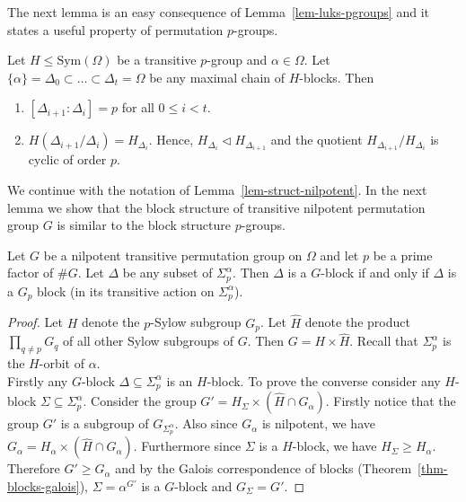 \documentclass{llncs}
\newcommand{\Sym}[1]{{\ensuremath{\mathrm{Sym}\left(#1\right)}}}
\begin{document}
The next lemma is an easy consequence of Lemma~\ref{lem-luks-pgroups}
and it states a useful property of permutation $p$-groups.

\begin{lemma}\label{lem-struct-pgroups}
  Let $H\leq\Sym{\Omega}$ be a transitive $p$-group and
  $\alpha\in\Omega$. Let $\{ \alpha \} = \Delta_0 \subset \ldots
  \subset \Delta_t = \Omega$ be any maximal chain of $H$-blocks. Then
  \begin{enumerate}
  \item $[\Delta_{i+1}: \Delta_i] = p$ for all $0 \leq i < t$.
  \item $H(\Delta_{i+1}/\Delta_i) = H_{\Delta_i}$. Hence,
    $H_{\Delta_i}\lhd H_{\Delta_{i+1}}$ and the quotient
    $H_{\Delta_{i+1}}/H_{\Delta_i}$ is cyclic of order $p$.
  \end{enumerate}
\end{lemma}


We continue with the notation of Lemma~\ref{lem-struct-nilpotent}. In
the next lemma we show that the block structure of transitive
nilpotent permutation group $G$ is similar to the block structure $p$-groups.

\begin{lemma}\label{lem-nilpotent-pgroup}
  Let $G$ be a nilpotent transitive permutation group on $\Omega$ and
let $p$ be a prime factor of $\# G$. Let $\Delta$ be any subset of
$\Sigma_p^\alpha$. Then $\Delta$ is a $G$-block if and only if
$\Delta$ is a $G_p$ block (in its transitive action on
$\Sigma^\alpha_p$).
\end{lemma}
\begin{proof}
  Let $H$ denote the $p$-Sylow subgroup $G_p$. Let $\widehat{H}$
 denote the product $\prod_{q\neq p}G_q$ of all other Sylow subgroups
 of $G$. Then $G=H\times\widehat{H}$. Recall that $\Sigma^\alpha_p$ is
 the $H$-orbit of $\alpha$.\\

 Firstly any $G$-block $\Delta\subseteq\Sigma^\alpha_p$ is an
$H$-block. To prove the converse consider any $H$-block
$\Sigma\subseteq\Sigma^\alpha_p$. Consider the group $G' = H_\Sigma
\times (\widehat{H} \cap G_\alpha)$. Firstly notice that the group
$G'$ is a subgroup of $G_{\Sigma_p^\alpha}$. Also since $G_\alpha$ is
nilpotent, we have $G_\alpha = H_\alpha \times (\widehat{H} \cap
G_\alpha)$. Furthermore since $\Sigma$ is a $H$-block, we have
$H_\Sigma \geq H_\alpha$. Therefore $G' \geq G_\alpha$ and by the
Galois correspondence of blocks (Theorem~\ref{thm-blocks-galois}),
$\Sigma = \alpha^{G'}$ is a $G$-block and $G_\Sigma = G'$.
\end{proof}
\end{document}
